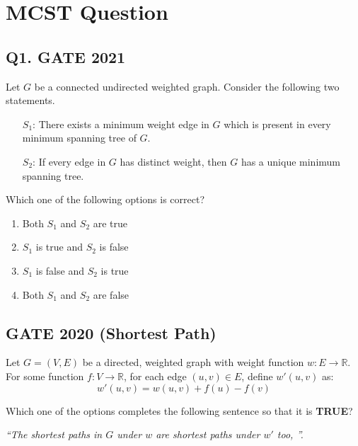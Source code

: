 \section{MCST Question}
\subsection*{Q1. GATE 2021}
Let $G$ be a connected undirected weighted graph. Consider the following two statements.

\begin{itemize}
    \item[$S_1$:] There exists a minimum weight edge in $G$ which is present in every minimum spanning tree of $G$.
    \item[$S_2$:] If every edge in $G$ has distinct weight, then $G$ has a unique minimum spanning tree.
\end{itemize}

Which one of the following options is correct?

\begin{enumerate}[label=(\alph*)]
    \item Both $S_1$ and $S_2$ are true
    \item $S_1$ is true and $S_2$ is false
    \item $S_1$ is false and $S_2$ is true
    \item Both $S_1$ and $S_2$ are false
\end{enumerate}

\subsection*{GATE 2020 (Shortest Path)}
Let $G = (V,E)$ be a directed, weighted graph with weight function $w: E \rightarrow \mathbb{R}$. For some function $f: V \rightarrow \mathbb{R}$, for each edge $(u,v) \in E$, define $w'(u,v)$ as:
\[
w'(u,v) = w(u,v) + f(u) - f(v)
\]

Which one of the options completes the following sentence so that it is \textbf{TRUE}?

\textit{“The shortest paths in $G$ under $w$ are shortest paths under $w'$ too, \underline{\hspace{4cm}}”.}


